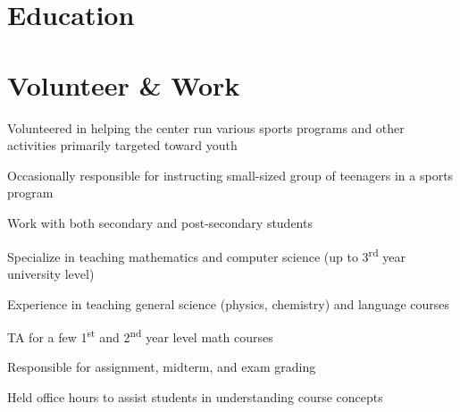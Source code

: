 \documentclass[]{deedy-resume-openfont}
\begin{document}
~\\~\\

\section{Education}
\sectionsep

\section{Volunteer \& Work}
\vspace{\topsep} %
\begin{tightemize}
\item Volunteered in helping the center run various sports programs and other activities primarily targeted toward youth 
\item Occasionally responsible for instructing small-sized group of teenagers in a sports program
\end{tightemize}
\sectionsep

\descript{}
\begin{tightemize}
\item Work with both secondary and post-secondary students
\item Specialize in teaching mathematics and computer science (up to 3\textsuperscript{rd} year university level)
\item Experience in teaching general science (physics, chemistry) and language courses
\end{tightemize}
\sectionsep

\begin{tightemize}
\item TA for a few 1\textsuperscript{st} and 2\textsuperscript{nd} year level math courses
\item Responsible for assignment, midterm, and exam grading
\item Held office hours to assist students in understanding course concepts
\end{tightemize}
\sectionsep
\end{document}
